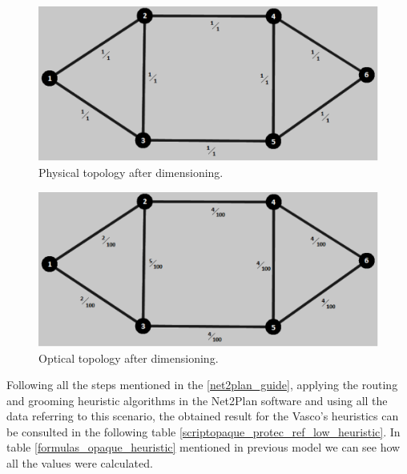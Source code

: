 \begin{figure}[H]
\centering
\includegraphics[width=13cm]{sdf/heuristic/opaque_protection/figures/physical_topology}
\caption{Physical topology after dimensioning.}
\label{physical_topology_protec_ref_low_heuristic}
\end{figure}

\begin{figure}[H]
\centering
\includegraphics[width=13cm]{sdf/heuristic/opaque_protection/figures/optical_topology_low}
\caption{Optical topology after dimensioning.}
\label{optical_topology_protec_ref_low_heuristic}
\end{figure}

Following all the steps mentioned in the \ref{net2plan_guide}, applying the routing and grooming heuristic algorithms in the Net2Plan software and using all the data referring to this scenario, the obtained result for the Vasco's heuristics can be consulted in the following table \ref{scriptopaque_protec_ref_low_heuristic}. In table \ref{formulas_opaque_heuristic} mentioned in previous model we can see how all the values were calculated. \\

